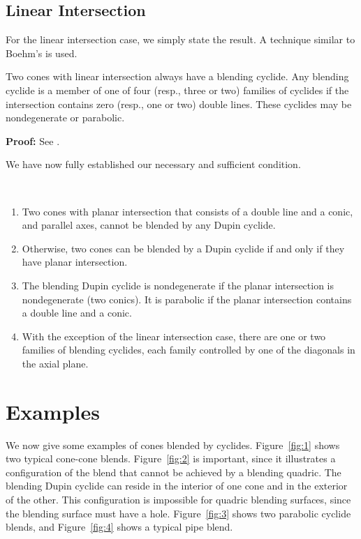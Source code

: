 \subsection{Linear Intersection}
\label{section:cyc-linear}

For the linear intersection case, we simply state the result.
A technique similar to Boehm's \cite{boehm:1990} is used.

\begin{lemma}
\label{thm:linear-inter-blending}
     Two cones with linear intersection always have a blending cyclide.
Any blending cyclide is a member of one of four (resp., three or two) families
of cyclides if the intersection contains zero (resp., one or two) double
lines.  These cyclides may be nondegenerate or parabolic.
\end{lemma}
{\bf Proof:} See \cite[Section~5.9]{shenethesis}.
\QED

We have now fully established our necessary and sufficient condition.

\begin{theorem}\ 
\begin{enumerate}
\item
Two cones with planar intersection
that consists of a double line and a conic, and parallel axes, 
cannot be blended by any Dupin cyclide.
\item
Otherwise, two cones can be blended by a Dupin cyclide if and only if 
they have planar intersection.
\item
The blending Dupin cyclide is nondegenerate if the planar
intersection is nondegenerate (two conics).
It is parabolic if the planar 
intersection contains a double line and a conic.
\item
With the exception of the linear intersection case,
there are one or two families of blending cyclides, each family 
controlled by one of the diagonals in the axial plane. 
\end{enumerate}
\end{theorem}

\section{Examples}
\label{section:eg}

We now give some examples of cones blended by cyclides.
Figure~\ref{fig:1} shows two typical cone-cone blends.
Figure~\ref{fig:2} is important, since it illustrates
a configuration of the blend that cannot be achieved by a blending quadric.
The blending Dupin cyclide can reside in the interior of one cone and
in the exterior of the other.
This configuration is impossible for quadric blending surfaces, since
the blending surface must have a hole.
Figure~\ref{fig:3} shows two parabolic cyclide blends, and Figure~\ref{fig:4}
shows a typical pipe blend.

